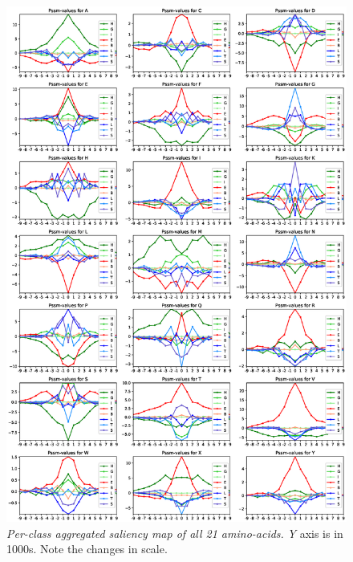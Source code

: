\begin{figure}
\centering
\includegraphics[width=1\linewidth]{Figures/class_agg_aa_all}
\caption{\textit{Per-class aggregated saliency map of all 21 amino-acids.} \textit{Y} axis is in 1000s. Note the changes in scale.}
\label{fig:class_agg_aa_all}
\end{figure}
